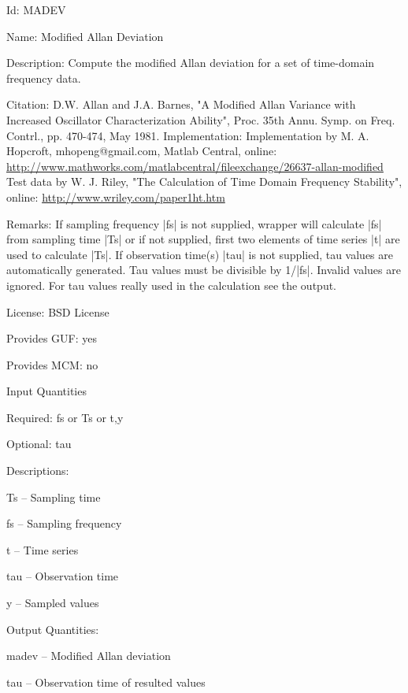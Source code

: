 \begin{tightdesc}
\item [Id:] MADEV
\item [Name:] Modified Allan Deviation
\item [Description:] Compute the modified Allan deviation for a set of time-domain frequency data.
\item [Citation:] D.W. Allan and J.A. Barnes, "A Modified Allan Variance with Increased Oscillator Characterization Ability", Proc. 35th Annu. Symp. on Freq. Contrl., pp. 470-474, May 1981. Implementation: Implementation by M. A. Hopcroft, mhopeng@gmail.com, Matlab Central, online: \url{http://www.mathworks.com/matlabcentral/fileexchange/26637-allan-modified} Test data by W. J. Riley, "The Calculation of Time Domain Frequency Stability", online: \url{http://www.wriley.com/paper1ht.htm}
\item [Remarks:] If sampling frequency |fs| is not supplied, wrapper will calculate |fs| from sampling time |Ts| or if not supplied, first two elements of time series |t| are used to calculate |Ts|. If observation time(s) |tau| is not supplied, tau values are automatically generated. Tau values must be divisible by 1/|fs|. Invalid values are ignored. For tau values really used in the calculation see the output.
\item [License:] BSD License
\item [Provides GUF:] yes
\item [Provides MCM:] no
\item [Input Quantities] \rule{0em}{0em}
    \begin{tightdesc}
    \item [Required:] 
        \textsf{fs} or \textsf{Ts} or \textsf{t},\enspace \textsf{y}
    \item [Optional:] 
        \textsf{tau}
    \item [Descriptions:] \rule{0em}{0em}
        \begin{tightdesc}
            \item[\textsf{Ts}] -- Sampling time
            \item[\textsf{fs}] -- Sampling frequency
            \item[\textsf{t}] -- Time series
            \item[\textsf{tau}] -- Observation time
            \item[\textsf{y}] -- Sampled values
        \end{tightdesc}
    \end{tightdesc}
\item [Output Quantities:] \rule{0em}{0em}
    \begin{tightdesc}
        \item[\textsf{madev}] -- Modified Allan deviation
        \item[\textsf{tau}] -- Observation time of resulted values
    \end{tightdesc}
\end{tightdesc}

